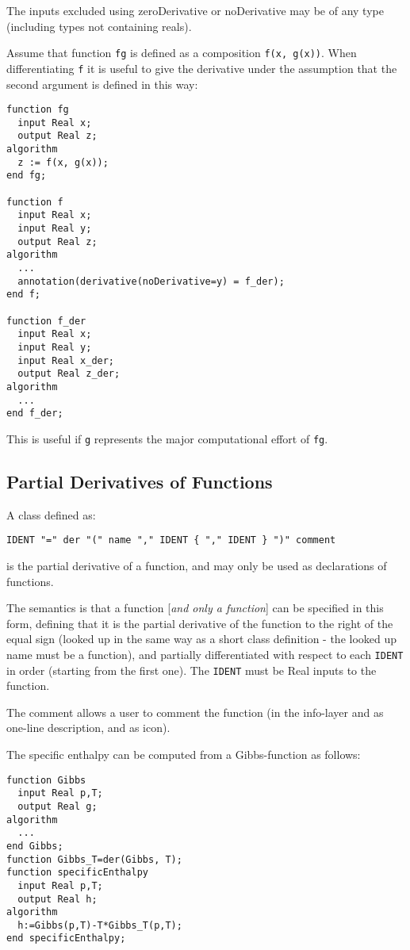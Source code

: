 The inputs excluded using zeroDerivative or noDerivative may be of any
type (including types not containing reals).

\begin{nonnormative}
Assume that function \lstinline!fg! is defined as a composition \lstinline!f(x, g(x))!.
When differentiating \lstinline!f! it is useful to give the derivative under the
assumption that the second argument is defined in this way:
\begin{lstlisting}[language=modelica]
function fg
  input Real x;
  output Real z;
algorithm
  z := f(x, g(x));
end fg;

function f
  input Real x;
  input Real y;
  output Real z;
algorithm
  ...
  annotation(derivative(noDerivative=y) = f_der);
end f;

function f_der
  input Real x;
  input Real y;
  input Real x_der;
  output Real z_der;
algorithm
  ...
end f_der;
\end{lstlisting}
This is useful if \lstinline!g! represents the major computational
effort of \lstinline!fg!.
\end{nonnormative}

\subsection{Partial Derivatives of Functions}

A class defined as:
\begin{lstlisting}[language=grammar]
IDENT "=" der "(" name "," IDENT { "," IDENT } ")" comment
\end{lstlisting}

is the partial derivative of a function, and may only be used as
declarations of functions.

The semantics is that a function {[}\emph{and only a function}{]} can be
specified in this form, defining that it is the partial derivative of
the function to the right of the equal sign (looked up in the same way
as a short class definition - the looked up name must be a function),
and partially differentiated with respect to each \lstinline!IDENT! in order
(starting from the first one). The \lstinline!IDENT! must be Real inputs to the
function.

The comment allows a user to comment the function (in the info-layer and
as one-line description, and as icon).

\begin{example}
The specific enthalpy can be computed from a Gibbs-function as follows:
\begin{lstlisting}[language=modelica]
function Gibbs
  input Real p,T;
  output Real g;
algorithm
  ...
end Gibbs;
function Gibbs_T=der(Gibbs, T);
function specificEnthalpy
  input Real p,T;
  output Real h;
algorithm
  h:=Gibbs(p,T)-T*Gibbs_T(p,T);
end specificEnthalpy;
\end{lstlisting}
\end{example}


